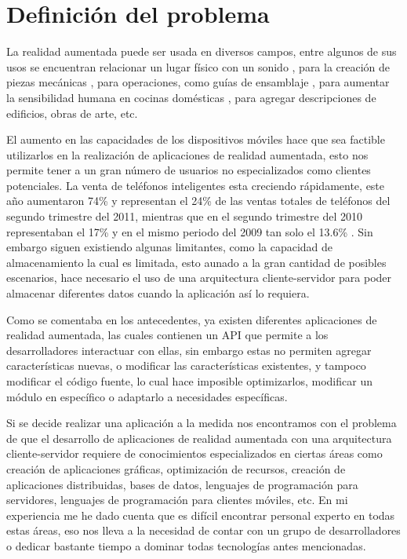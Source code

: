 \documentclass[12pt,a4paper,spanish,openany]{book}
\begin{document}
\section{Definición del problema}

La realidad aumentada puede ser usada en diversos campos, entre
algunos de sus usos se encuentran relacionar un lugar físico con un sonido
\cite{hat}, para la creación de piezas mecánicas \cite{rtpr} , para
operaciones, como guías de ensamblaje \cite{rupr}, para aumentar la
sensibilidad humana en cocinas domésticas \cite{sui}, para agregar
descripciones de edificios, obras de arte, etc. 

El aumento en las capacidades de los dispositivos móviles hace que sea
factible utilizarlos en la realización de aplicaciones de realidad aumentada,
esto nos permite tener a un gran número de usuarios no especializados como
clientes potenciales. La venta de teléfonos inteligentes esta creciendo
rápidamente, este año aumentaron 74\% y representan el 24\% de las ventas
totales de teléfonos del segundo trimestre del 2011, mientras que en el segundo
trimestre del 2010 representaban el 17\% \cite{md2011} y en el mismo periodo
del 2009 tan solo el 13.6\% \cite{md2010}. Sin embargo siguen existiendo
algunas limitantes, como la capacidad de almacenamiento la cual es limitada,
esto aunado a la gran cantidad de posibles escenarios, hace necesario el uso de
una arquitectura cliente-servidor para poder almacenar diferentes datos cuando
la aplicación así lo requiera.

Como se comentaba en los antecedentes, ya existen diferentes aplicaciones de
realidad aumentada, las cuales contienen un API que permite a los
desarrolladores interactuar con ellas, sin embargo estas no permiten agregar
características nuevas, o modificar las características existentes, y tampoco
modificar el código fuente, lo cual hace imposible optimizarlos, modificar un
módulo en específico o adaptarlo a necesidades específicas.

Si se decide realizar una aplicación a la medida nos encontramos con el
problema de que el desarrollo de aplicaciones de realidad aumentada con una
arquitectura cliente-servidor requiere de conocimientos especializados en
ciertas áreas como creación de aplicaciones gráficas, optimización de recursos,
creación de aplicaciones distribuidas, bases de datos, lenguajes de programación
para servidores, lenguajes de programación para clientes móviles, etc. En mi
experiencia me he dado cuenta que es difícil encontrar personal experto en todas
estas áreas, eso nos lleva a la necesidad de contar con un grupo de
desarrolladores o dedicar bastante tiempo a dominar todas tecnologías antes mencionadas.
\end{document}
